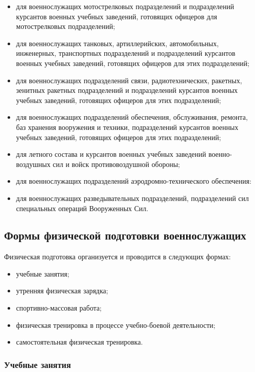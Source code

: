 \documentclass[a4paper]{article}
\begin{document}
    \begin{itemize}
        \item для военнослужащих мотострелковых подразделений и подразделений курсантов военных учебных заведений, готовящих офицеров для мотострелковых подразделений;
        \item для военнослужащих танковых, артиллерийских, автомобильных, инженерных, транспортных подразделений и подразделений курсантов военных учебных заведений, готовящих офицеров для этих подразделений;
        \item для военнослужащих подразделений связи, радиотехнических, ракетных, зенитных ракетных подразделений и подразделений курсантов военных учебных заведений, готовящих офицеров для этих подразделений;
        \item для военнослужащих подразделений обеспечения, обслуживания, ремонта, баз хранения вооружения и техники, подразделений курсантов военных учебных заведений, готовящих офицеров для этих подразделений;
        \item для летного состава и курсантов военных учебных заведений военно-воздушных сил и войск противовоздушной обороны;
        \item для военнослужащих подразделений аэродромно-технического обеспечения:
        \item для военнослужащих разведывательных подразделений, подразделений сил специальных операций Вооруженных Сил.
    \end{itemize}

    \subsection{Формы физической подготовки военнослужащих}
    
    Физическая подготовка организуется и проводится в следующих формах:

    \begin{itemize}
        \item учебные занятия;
        \item утренняя физическая зарядка;
        \item спортивно-массовая работа;
        \item физическая тренировка в процессе учебно-боевой деятельности;
        \item самостоятельная физическая тренировка.
    \end{itemize}

    \subsubsection{Учебные занятия}
\end{document}
